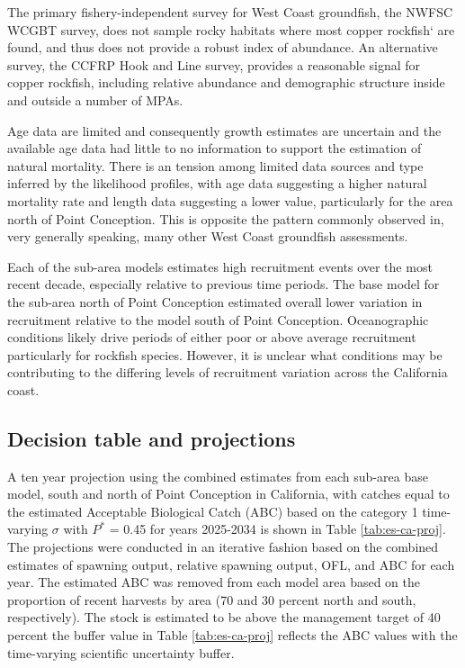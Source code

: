 \documentclass[11pt,
  english,
  letterpaper,
]{article}
\begin{document}
The primary fishery-independent survey for West Coast groundfish, the NWFSC WCGBT survey, does not sample rocky habitats where most copper rockfish` are found, and thus does not provide a robust index of abundance. An alternative survey, the CCFRP Hook and Line survey, provides a reasonable signal for copper rockfish, including relative abundance and demographic structure inside and outside a number of MPAs.

Age data are limited and consequently growth estimates are uncertain and the available age data had little to no information to support the estimation of natural mortality. There is an tension among limited data sources and type inferred by the likelihood profiles, with age data suggesting a higher natural mortality rate and length data suggesting a lower value, particularly for the area north of Point Conception. This is opposite the pattern commonly observed in, very generally speaking, many other West Coast groundfish assessments.

Each of the sub-area models estimates high recruitment events over the most recent decade, especially relative to previous time periods. The base model for the sub-area north of Point Conception estimated overall lower variation in recruitment relative to the model south of Point Conception. Oceanographic conditions likely drive periods of either poor or above average recruitment particularly for rockfish species. However, it is unclear what conditions may be contributing to the differing levels of recruitment variation across the California coast.

\hypertarget{decision-table-and-projections}{%
\subsection*{Decision table and projections}\label{decision-table-and-projections}}

A ten year projection using the combined estimates from each sub-area base model, south and north of Point Conception in California, with catches equal to the estimated Acceptable Biological Catch (ABC) based on the category 1 time-varying \(\sigma\) with \(P^*\) = 0.45 for years 2025-2034 is shown in Table \ref{tab:es-ca-proj}. The projections were conducted in an iterative fashion based on the combined estimates of spawning output, relative spawning output, OFL, and ABC for each year. The estimated ABC was removed from each model area based on the proportion of recent harvests by area (70 and 30 percent north and south, respectively). The stock is estimated to be above the management target of 40 percent the buffer value in Table \ref{tab:es-ca-proj} reflects the ABC values with the time-varying scientific uncertainty buffer.
\end{document}

